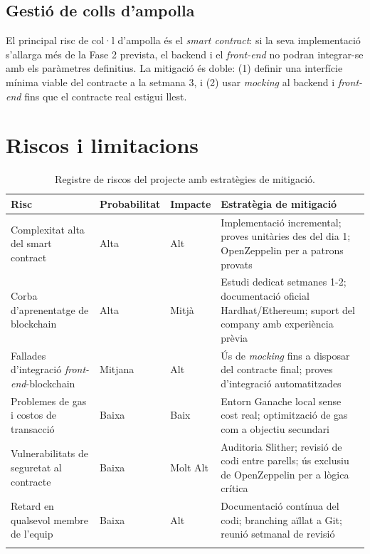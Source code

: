 \documentclass[12pt,a4paper,catalan]{article}
\begin{document}
\subsection{Gestió de colls d'ampolla}

El principal risc de col·l d'ampolla és el \textit{smart contract}: si la seva implementació s'allarga més de la Fase 2 prevista, el backend i el \textit{front-end} no podran integrar-se amb els paràmetres definitius. La mitigació és doble: (1) definir una interfície mínima viable del contracte a la setmana 3, i (2) usar \textit{mocking} al backend i \textit{front-end} fins que el contracte real estigui llest.

\section{Riscos i limitacions}

\begin{longtable}{p{3.5cm}p{2cm}p{2cm}p{4.5cm}}
    \toprule
    \textbf{Risc} & \textbf{Probabilitat} & \textbf{Impacte} & \textbf{Estratègia de mitigació} \\
    \midrule
    Complexitat alta del smart contract & Alta & Alt & Implementació incremental; proves unitàries des del dia 1; OpenZeppelin per a patrons provats \\
    \addlinespace
    Corba d'aprenentatge de blockchain & Alta & Mitjà & Estudi dedicat setmanes 1-2; documentació oficial Hardhat/Ethereum; suport del company amb experiència prèvia \\
    \addlinespace
    Fallades d'integració \textit{front-end}-blockchain & Mitjana & Alt & Ús de \textit{mocking} fins a disposar del contracte final; proves d'integració automatitzades \\
    \addlinespace
    Problemes de gas i costos de transacció & Baixa & Baix & Entorn Ganache local sense cost real; optimització de gas com a objectiu secundari \\
    \addlinespace
    Vulnerabilitats de seguretat al contracte & Baixa & Molt Alt & Auditoria Slither; revisió de codi entre parells; ús exclusiu de OpenZeppelin per a lògica crítica \\
    \addlinespace
    Retard en qualsevol membre de l'equip & Baixa & Alt & Documentació contínua del codi; branching aïllat a Git; reunió setmanal de revisió \\
    \bottomrule
    \caption{Registre de riscos del projecte amb estratègies de mitigació.}
\end{longtable}
\end{document}

